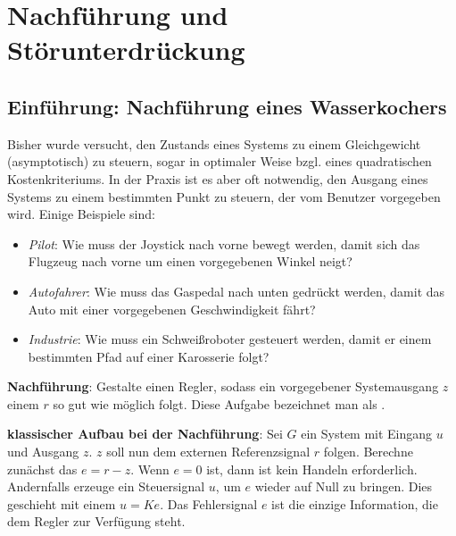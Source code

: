 \section{%
    Nachführung und Störunterdrückung%
}

\subsection{%
    Einführung: Nachführung eines Wasserkochers%
}

Bisher wurde versucht, den Zustands eines Systems zu einem Gleichgewicht (asymptotisch) zu steuern,
sogar in optimaler Weise bzgl. eines quadratischen Kostenkriteriums.
In der Praxis ist es aber oft notwendig, den Ausgang eines Systems zu einem bestimmten Punkt zu
steuern, der vom Benutzer vorgegeben wird.
Einige Beispiele sind:
\begin{itemize}
    \item
    \emph{Pilot}:
    Wie muss der Joystick nach vorne bewegt werden, damit sich das Flugzeug nach vorne um
    einen vorgegebenen Winkel neigt?
    
    \item
    \emph{Autofahrer}:
    Wie muss das Gaspedal nach unten gedrückt werden, damit das Auto mit einer vorgegebenen
    Geschwindigkeit fährt?
    
    \item
    \emph{Industrie}:
    Wie muss ein Schweißroboter gesteuert werden, damit er einem bestimmten Pfad auf einer
    Karosserie folgt?
\end{itemize}

\textbf{Nachführung}:
Gestalte einen Regler,
sodass ein vorgegebener Systemausgang $z$ einem  $r$
so gut wie möglich folgt.
Diese Aufgabe bezeichnet man als .

\linie

\textbf{klassischer Aufbau bei der Nachführung}:
Sei $G$ ein System mit Eingang $u$ und Ausgang $z$.
$z$ soll nun dem externen Referenzsignal $r$ folgen.
Berechne zunächst das  $e = r - z$.
Wenn $e = 0$ ist, dann ist kein Handeln erforderlich.
Andernfalls erzeuge ein Steuersignal $u$, um $e$ wieder auf Null zu bringen.
Dies geschieht mit einem  $u = Ke$.
Das Fehlersignal $e$ ist die einzige Information, die dem Regler zur Verfügung steht.

\linie

